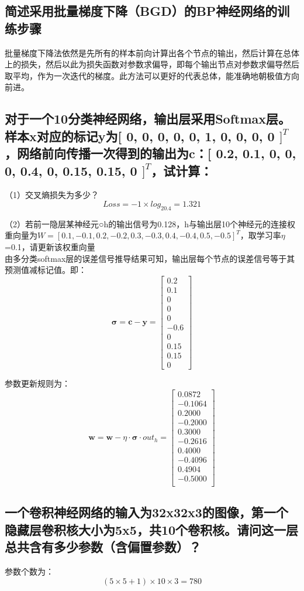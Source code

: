 \documentclass{ctexart}
\begin{document}
\subsection*{简述采用批量梯度下降（BGD）的BP神经网络的训练步骤}

批量梯度下降法依然是先所有的样本前向计算出各个节点的输出，然后计算在总体上的损失，然后以此为损失函数对参数求偏导，即每个输出节点对参数求偏导然后取平均，作为一次迭代的梯度。此方法可以更好的代表总体，能准确地朝极值方向前进。

\subsection*{对于一个10分类神经网络，输出层采用Softmax层。样本x对应的标记y为[ 0, 0, 0, 0, 0, 1, 0, 0, 0, 0 $]^T$，网络前向传播一次得到的输出为$\bm{c}$：[ 0.2, 0.1, 0, 0, 0, 0.4, 0, 0.15, 0.15, 0 $]^T$，试计算：}

（1）交叉熵损失为多少？\\

\begin{equation*}
Loss=-1\times log_20.4= 1.321
\end{equation*}


（2）若前一隐层某神经元○h的输出信号为0.128，h与输出层10个神经元的连接权重向量为$W=[0.1,-0.1,0.2,-0.2,0.3,-0.3,0.4,-0.4,0.5,-0.5]^T$，取学习率$\eta$=0.1，请更新该权重向量\\

由多分类softmax层的误差信号推导结果可知，输出层每个节点的误差信号等于其预测值减标记值。即：
\begin{equation*}
\bm{\sigma}=\bm{c}-\bm{y}=\begin{bmatrix}
 0.2\\0.1\\0\\0\\0\\-0.6\\0\\0.15\\0.15\\0
\end{bmatrix}
\end{equation*}

参数更新规则为：
\begin{equation*}
\bm{w}=\bm{w}-\eta\cdot\bm{\sigma}\cdot out_h=\begin{bmatrix}
0.0872\\-0.1064\\0.2000\\-0.2000\\0.3000\\-0.2616\\0.4000\\-0.4096\\	0.4904\\-0.5000\\
\end{bmatrix}
\end{equation*}

\subsection*{一个卷积神经网络的输入为32x32x3的图像，第一个隐藏层卷积核大小为5x5，共10个卷积核。请问这一层总共含有多少参数（含偏置参数）？}


参数个数为：
\begin{equation*}
(5\times5+1)\times10\times3=780
\end{equation*}
\end{document}
